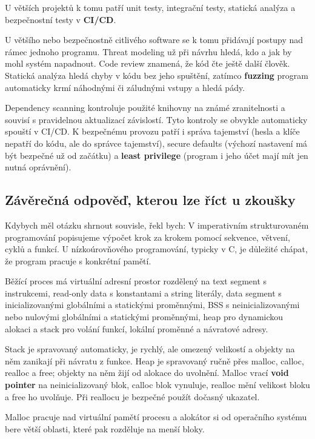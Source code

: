 \documentclass[11pt,a4paper]{article}
\begin{document}
U větších projektů k tomu patří unit testy, integrační testy, statická analýza a bezpečnostní testy v \textbf{CI/CD}.

U většího nebo bezpečnostně citlivého software se k tomu přidávají postupy nad rámec jednoho programu. Threat modeling už při návrhu hledá, kdo a jak by mohl systém napadnout. Code review znamená, že kód čte ještě další člověk. Statická analýza hledá chyby v kódu bez jeho spuštění, zatímco \textbf{fuzzing} program automaticky krmí náhodnými či záludnými vstupy a hledá pády.

Dependency scanning kontroluje použité knihovny na známé zranitelnosti a souvisí s pravidelnou aktualizací závislostí. Tyto kontroly se obvykle automaticky spouští v CI/CD. K bezpečnému provozu patří i správa tajemství (hesla a klíče nepatří do kódu, ale do správce tajemství), secure defaults (výchozí nastavení má být bezpečné už od začátku) a \textbf{least privilege} (program i jeho účet mají mít jen nutná oprávnění).

\subsection*{Závěrečná odpověď, kterou lze říct u zkoušky}

Kdybych měl otázku shrnout souvisle, řekl bych: V imperativním strukturovaném programování popisujeme výpočet krok za krokem pomocí sekvence, větvení, cyklů a funkcí. U nízkoúrovňového programování, typicky v C, je důležité chápat, že program pracuje s konkrétní pamětí.

Běžící proces má virtuální adresní prostor rozdělený na text segment s instrukcemi, read-only data s konstantami a string literály, data segment s inicializovanými globálními a statickými proměnnými, BSS s neinicializovanými nebo nulovými globálními a statickými proměnnými, heap pro dynamickou alokaci a stack pro volání funkcí, lokální proměnné a návratové adresy.

Stack je spravovaný automaticky, je rychlý, ale omezený velikostí a objekty na něm zanikají při návratu z funkce. Heap je spravovaný ručně přes malloc, calloc, realloc a free; objekty na něm žijí od alokace do uvolnění. Malloc vrací \textbf{void pointer} na neinicializovaný blok, calloc blok vynuluje, realloc mění velikost bloku a free ho uvolňuje. Při reallocu je bezpečné použít dočasný ukazatel.

Malloc pracuje nad virtuální pamětí procesu a alokátor si od operačního systému bere větší oblasti, které pak rozděluje na menší bloky.
\end{document}
